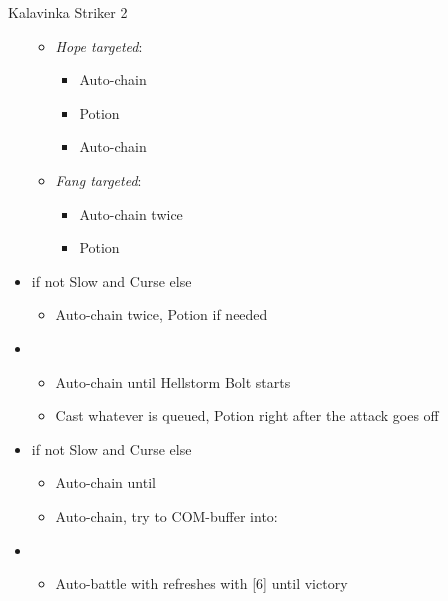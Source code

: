 \begin{multicols}{2}
\begin{battle}{Kalavinka Striker 2}
\begin{itemize}
\begin{itemize}
        \item \textit{Hope targeted}:
        \begin{itemize}
            \item Auto-chain
            \item Potion
            \item Auto-chain
        \end{itemize}
        \item \textit{Fang targeted}:
        \begin{itemize}
            \item Auto-chain twice
            \item Potion
        \end{itemize}
    \end{itemize}
    \item \second if not Slow and Curse else \fourth
    \begin{itemize}
        \item Auto-chain twice, Potion if needed
    \end{itemize}
    \item \third
    \begin{itemize}
        \item Auto-chain until Hellstorm Bolt starts
        \item Cast whatever is queued, Potion right after the attack goes off
    \end{itemize}
    \item \second if not Slow and Curse else \fourth
    \begin{itemize}
        \item Auto-chain until \stagger
        \item Auto-chain, try to COM-buffer into:
    \end{itemize}
    \item \fifth
    \begin{itemize}
        \item Auto-battle with refreshes with [6] until victory
    \end{itemize}
\end{itemize}
\end{battle}
\end{multicols}
\newpage
\renewcommand{\first}{[1] Strike Team (\com/\syn/\com)}
\renewcommand{\second}{[2] Tri-Disaster (\rav/\rav/\rav)}
\renewcommand{\third}{[3] Strategic Warfare (\com/\syn/\sen)}
\renewcommand{\fourth}{[4] Tri-Disaster (\rav/\rav/\rav)}
\renewcommand{\fifth}{[5] Cerberus (\com/\com/\com)}
